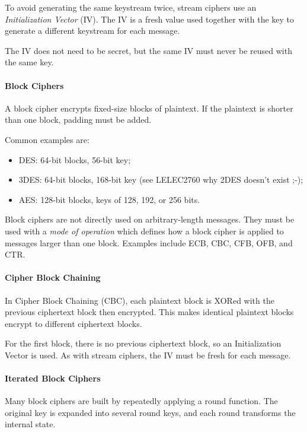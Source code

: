 To avoid generating the same keystream twice, stream ciphers use an
\emph{Initialization Vector} (IV). The IV is a fresh value used together
with the key to generate a different keystream for each message.

The IV does not need to be secret, but the same IV must never be reused
with the same key.

\paragraph{Block Ciphers}

A block cipher encrypts fixed-size blocks of plaintext. If the plaintext
is shorter than one block, padding must be added.

Common examples are:

\begin{itemize}
    \item DES\@: 64-bit blocks, 56-bit key;
    \item 3DES\@: 64-bit blocks, 168-bit key (see LELEC2760 why 2DES doesn't exist ;-);
    \item AES\@: 128-bit blocks, keys of 128, 192, or 256 bits.
\end{itemize}

Block ciphers are not directly used on arbitrary-length messages. They
must be used with a \emph{mode of operation} which defines how a block cipher is applied to messages larger than one block. Examples include ECB\@, CBC\@, CFB\@, OFB\@, and CTR\@.


\paragraph{Cipher Block Chaining}

In Cipher Block Chaining (CBC), each plaintext block is XORed with the
previous ciphertext block then encrypted. This makes identical
plaintext blocks encrypt to different ciphertext blocks.

For the first block, there is no previous ciphertext block, so an
Initialization Vector is used. As with stream ciphers, the IV must be
fresh for each message.


\paragraph{Iterated Block Ciphers}

Many block ciphers are built by repeatedly applying a round function.
The original key is expanded into several round keys, and each round
transforms the internal state.

